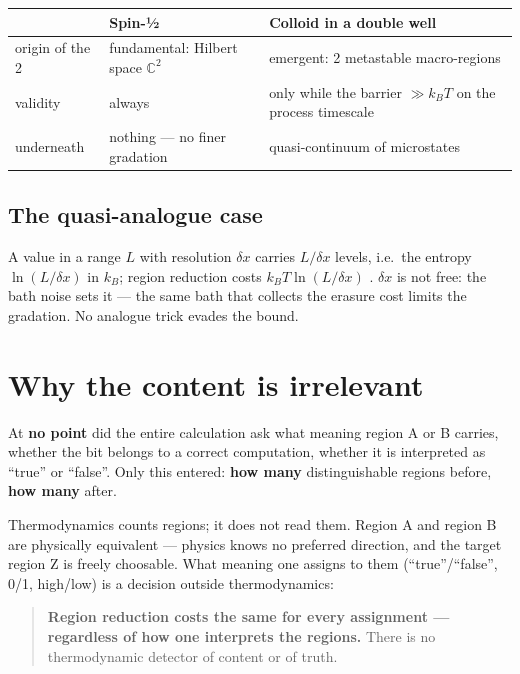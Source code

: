 \begin{center}
\small
\begin{tabular}{@{}p{}p{}p{}@{}}
\toprule
 & \textbf{Spin-½} & \textbf{Colloid in a double well} \\
\midrule
origin of the 2 & fundamental: Hilbert space $\mathbb{C}^2$ & emergent: 2 metastable macro-regions \\
validity & always & only while the barrier $\gg k_B T$ on the process timescale \\
underneath & nothing --- no finer gradation & quasi-continuum of microstates \\
\bottomrule
\end{tabular}
\end{center}

\subsection{The quasi-analogue case}

A value in a range $L$ with resolution $\delta x$ carries $L/\delta x$
levels, i.e.\ the entropy $\ln(L/\delta x)$ in $k_B$; region reduction costs $k_B T \ln(L/\delta x)$ . $\delta x$
is not free: the bath noise sets it --- the same bath that collects the erasure
cost limits the gradation. No analogue trick evades the bound.

\section{Why the content is irrelevant}
\label{sec:content}

At \textbf{no point} did the entire calculation ask what meaning region A or B
carries, whether the bit belongs to a correct computation, whether it is
interpreted as “true” or “false”. Only this entered: \textbf{how many}
distinguishable regions before, \textbf{how many} after.

Thermodynamics counts regions; it does not read them. Region A and region B are
physically equivalent --- physics knows no preferred direction, and the target
region Z is freely choosable. What meaning one assigns to them
(“true”/“false”, 0/1, high/low) is a decision outside thermodynamics:

\begin{quote}
\LB \textbf{Region reduction costs the same for every assignment --- regardless of
how one interprets the regions.} There is no thermodynamic detector of content or
of truth.
\end{quote}

